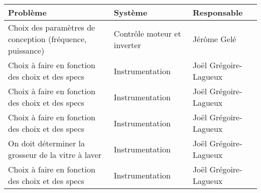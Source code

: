 \begin{tabularx}{\linewidth}{
    |>{\hsize=2.0\hsize}X|%
    >{\hsize=0.5\hsize}X|%
    >{\hsize=0.5\hsize}X|%
  }
    \hline
    Problème & Système & Responsable \\\hline
    Choix des paramètres de conception (fréquence, puissance) & Contrôle moteur et inverter & Jérôme Gelé \\\hline
    Choix à faire en fonction des choix et des specs & Instrumentation & Joël Grégoire-Lagueux \\\hline
    Choix à faire en fonction des choix et des specs & Instrumentation & Joël Grégoire-Lagueux \\\hline
    Choix à faire en fonction des choix et des specs & Instrumentation & Joël Grégoire-Lagueux \\\hline
    On doit déterminer la grosseur de la vitre à laver & Instrumentation & Joël Grégoire-Lagueux \\\hline
    Choix à faire en fonction des choix et des specs & Instrumentation & Joël Grégoire-Lagueux \\\hline
  \end{tabularx}
     